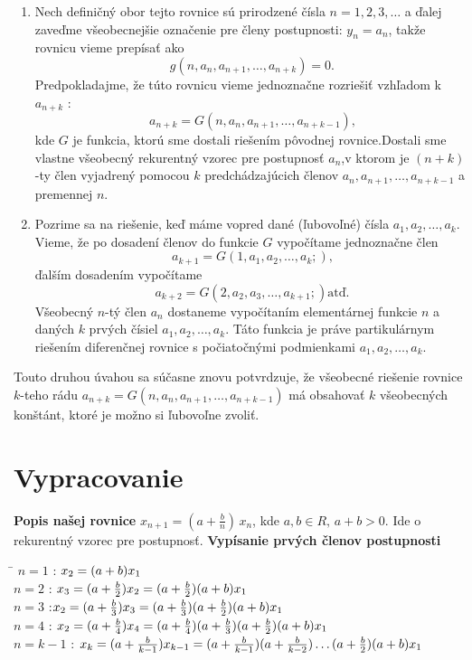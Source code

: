 \documentclass[a4paper,10pt]{article}
\theoremstyle{plain}
\theoremstyle{definition}
\begin{document}
\begin{enumerate}
	\item Nech definičný obor tejto rovnice sú prirodzené čísla $ n = 1, 2, 3, \ldots$ a
		ďalej zaveďme všeobecnejšie označenie pre členy postupnosti: $ y_{n} =  a_{n}$,
		takže rovnicu vieme prepísať ako  $$g(n, a_{n}, a_{n+1}, \ldots, a_{n+k}) = 0\text{.}$$
		Predpokladajme, že túto rovnicu vieme jednoznačne rozriešiť vzhľadom k $ a_{n+k}$ :
		$$a_{n+k} = G(n, a_{n}, a_{n+1}, \ldots, a_{n+k-1})\text{,}$$
		kde $G$ je funkcia, ktorú sme dostali riešením pôvodnej rovnice.\linebreak[4]
		 Dostali sme vlastne všeobecný rekurentný vzorec pre postupnosť $a_{n}$,\linebreak[4] v ktorom je $(n+k)$-ty 				člen vyjadrený pomocou $k$ predchádzajúcich členov 
		$a_{n}, a_{n+1}, \ldots, a_{n+k-1}$ a premennej $n$.
	\item Pozrime sa na riešenie, keď máme vopred dané (ľubovoľné) čísla $ a_{1}, a_{2}, \ldots, a_{k}$.
		Vieme, že po dosadení členov do funkcie $G$ vypočítame jednoznačne člen
		$$a_{k+1} = G(1, a_{1}, a_{2}, \ldots, a_{k};)\text{,}$$ ďalším dosadením vypočítame
		$$a_{k+2} = G(2, a_{2}, a_{3}, \ldots, a_{k+1};)\text{atď.}$$
		Všeobecný $n$-tý člen $ a_{n} $ dostaneme vypočítaním elementárnej funkcie
		$n$ a daných $k$ prvých čísiel $ a_{1}, a_{2}, \ldots, a_{k}$. Táto funkcia je práve partikulárnym riešením 				diferenčnej rovnice s počiatočnými podmienkami $ a_{1}, a_{2}, \ldots, a_{k}$.	
\end{enumerate}

Touto druhou úvahou sa súčasne znovu potvrdzuje, že všeobecné riešenie rovnice $k$-teho rádu 
$a_{n+k} = G(n, a_{n}, a_{n+1}, \ldots, a_{n+k-1})$ má obsahovať
$k$ všeobecných konštánt, ktoré je možno si ľubovoľne zvoliť.

\newpage
\section{Vypracovanie}
\textbf{Popis našej rovnice}\newline
$x_{n+1}=\left(a+{\frac{b}{n}}\right)\,x_{n}$, kde $a,b \in R,\, a+b >0$. Ide o rekurentný vzorec pre postupnosť.\newline\newline
\textbf{Vypísanie prvých členov postupnosti}
\begin{spacing}{1.4}
\begin{tabbing}
\hspace{2cm}\=\kill
 $n=1$ :\> $x_{2}= (a+b)\*x_{1}$\\ 
 $n=2$ :\>  $x_{3}=(a+\frac{b}{2})\*x_{2}=(a+\frac{b}{2})(a+b)\*x_{1}$ \\ 
 $n=3$ :\>$x_{2}=(a+\frac{b}{3})\*x_{3}=(a+\frac{b}{3})\*(a+\frac{b}{2})(a+b)\*x_{1}$\\
 $n=4$ :\> $x_{2}=(a+\frac{b}{4})\*x_{4}=(a+\frac{b}{4})\*(a+\frac{b}{3})\*(a+\frac{b}{2})
 (a+b)\*x_{1}$\\ 
  $n=k-1$ :\> $x_{k}=(a+\frac{b}{k-1})\*x_{k-1}=(a+\frac{b}{k-1})\*(a+\frac{b}{k-2})\ldots(a+\frac{b}{2})\*(a+b)\*x_{1}$
\end{tabbing} 
\end{spacing}
 
\end{document}
